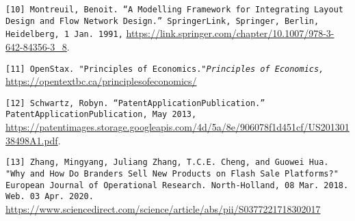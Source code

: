 \texttt{[10] Montreuil, Benoit. “A Modelling Framework for Integrating Layout Design and Flow Network Design.” SpringerLink, Springer, Berlin, Heidelberg, 1 Jan. 1991,}
\url{https://link.springer.com/chapter/10.1007/978-3-642-84356-3\_8}.

\texttt{[11] OpenStax. "Principles of Economics."\textit{Principles of Economics,}}
\url{https://opentextbc.ca/principlesofeconomics/}

\texttt{[12] Schwartz, Robyn. “PatentApplicationPublication.” PatentApplicationPublication, May 2013,}
\url{https://patentimages.storage.googleapis.com/4d/5a/8e/906078f1d451cf/US20130138498A1.pdf}.

\texttt{[13] Zhang, Mingyang, Juliang Zhang, T.C.E. Cheng, and Guowei Hua. "Why and How Do Branders Sell New Products on Flash Sale Platforms?" European Journal of Operational Research. North-Holland, 08 Mar. 2018. Web. 03 Apr. 2020.}
\url{https://www.sciencedirect.com/science/article/abs/pii/S0377221718302017}
